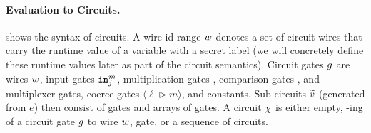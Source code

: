 \paragraph{Evaluation to Circuits.}
 shows the syntax of circuits. A wire id range
$w$ denotes a set of circuit wires that carry the runtime value of a
 variable with a secret label (we will concretely define these runtime
values later as part of the circuit semantics). Circuit gates ${g}$
are wires $w$, input gates ${\mathtt{in}}^m_j$, multiplication gates , comparison gates , and multiplexer  gates, 
coerce gates $\langle \ell \rhd m \rangle$, and constants.
Sub-circuits $\widetilde{v}$ (generated from $\widetilde e$) then consist of
gates and arrays of gates.  A circuit $\chi$ is either empty, -ing of a
circuit gate ${g}$ to wire $w$,  gate, or a sequence of
circuits.

